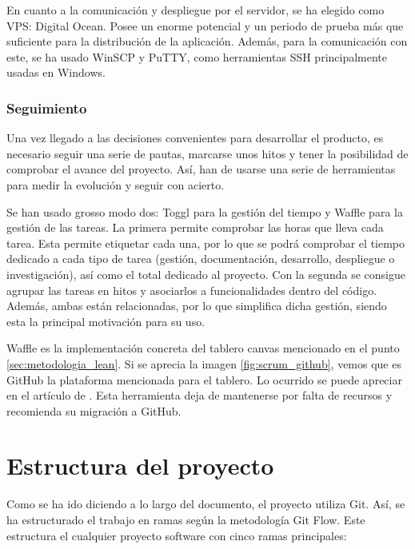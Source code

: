 En cuanto a la comunicación y despliegue por el servidor, se ha elegido como VPS: Digital Ocean. Posee un enorme potencial y un periodo de prueba más que suficiente para la distribución de la aplicación. Además, para la comunicación con este, se ha usado WinSCP y PuTTY, como herramientas SSH principalmente usadas en Windows.

\subsubsection{Seguimiento}

Una vez llegado a las decisiones convenientes para desarrollar el producto, es necesario seguir una serie de pautas, marcarse unos hitos y tener la posibilidad de comprobar el avance del proyecto. Así, han de usarse una serie de herramientas para medir la evolución y seguir con acierto.

Se han usado grosso modo dos: Toggl para la gestión del tiempo y Waffle para la gestión de las tareas. La primera permite comprobar las horas que lleva cada tarea. Esta permite etiquetar cada una, por lo que se podrá comprobar el tiempo dedicado a cada tipo de tarea (gestión, documentación, desarrollo, despliegue o investigación), así como el total dedicado al proyecto. Con la segunda se consigue agrupar las tareas en hitos y asociarlos a funcionalidades dentro del código. Además, ambas están relacionadas, por lo que simplifica dicha gestión, siendo esta la principal motivación para su uso.

Waffle es la implementación concreta del tablero canvas mencionado en el punto \ref{sec:metodologia_lean}. Si se aprecia la imagen \ref{fig:scrum_github}, vemos que es GitHub la plataforma mencionada para el tablero. Lo ocurrido se puede apreciar en el artículo de . Esta herramienta deja de mantenerse por falta de recursos y recomienda su migración a GitHub.

\section{Estructura del proyecto}\label{sec:estructra_proyecto}

Como se ha ido diciendo a lo largo del documento, el proyecto utiliza Git. Así, se ha estructurado el trabajo en ramas según la metodología Git Flow. Este estructura el cualquier proyecto software con cinco ramas principales:

